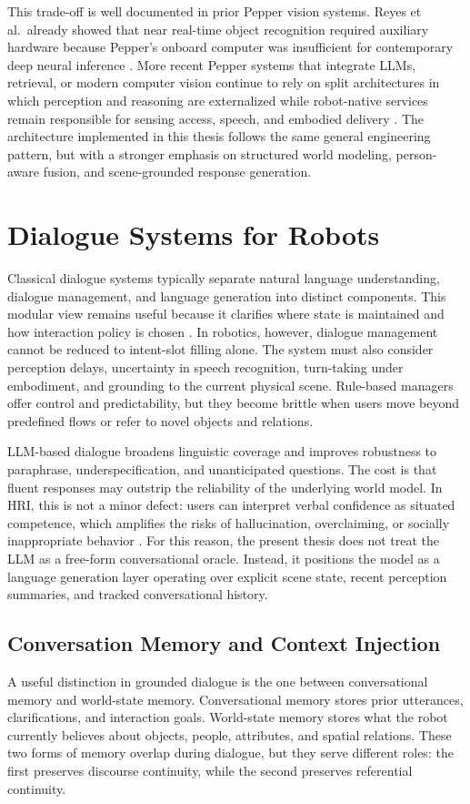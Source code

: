 \documentclass[
  digital,     %
  oneside,     %
  nosansbold,  %
  nocolorbold, %
  lof,         %
  lot,         %
]{fithesis4}
\begin{document}
This trade-off is well documented in prior Pepper vision systems. Reyes et al.\ already showed that near real-time object recognition required auxiliary hardware because Pepper's onboard computer was insufficient for contemporary deep neural inference \cite{reyes_near_2018}. More recent Pepper systems that integrate LLMs, retrieval, or modern computer vision continue to rely on split architectures in which perception and reasoning are externalized while robot-native services remain responsible for sensing access, speech, and embodied delivery \cite{brad_retrieval-augmented_2025}. The architecture implemented in this thesis follows the same general engineering pattern, but with a stronger emphasis on structured world modeling, person-aware fusion, and scene-grounded response generation.

\section{Dialogue Systems for Robots}
Classical dialogue systems typically separate natural language understanding, dialogue management, and language generation into distinct components. This modular view remains useful because it clarifies where state is maintained and how interaction policy is chosen \cite{chen_survey_2017, bocklisch_rasa_2017}. In robotics, however, dialogue management cannot be reduced to intent-slot filling alone. The system must also consider perception delays, uncertainty in speech recognition, turn-taking under embodiment, and grounding to the current physical scene. Rule-based managers offer control and predictability, but they become brittle when users move beyond predefined flows or refer to novel objects and relations.

LLM-based dialogue broadens linguistic coverage and improves robustness to paraphrase, underspecification, and unanticipated questions. The cost is that fluent responses may outstrip the reliability of the underlying world model. In HRI, this is not a minor defect: users can interpret verbal confidence as situated competence, which amplifies the risks of hallucination, overclaiming, or socially inappropriate behavior \cite{kim_understanding_2024, atuhurra_leveraging_2024}. For this reason, the present thesis does not treat the LLM as a free-form conversational oracle. Instead, it positions the model as a language generation layer operating over explicit scene state, recent perception summaries, and tracked conversational history.

\subsection{Conversation Memory and Context Injection}
A useful distinction in grounded dialogue is the one between conversational memory and world-state memory. Conversational memory stores prior utterances, clarifications, and interaction goals. World-state memory stores what the robot currently believes about objects, people, attributes, and spatial relations. These two forms of memory overlap during dialogue, but they serve different roles: the first preserves discourse continuity, while the second preserves referential continuity.
\end{document}
